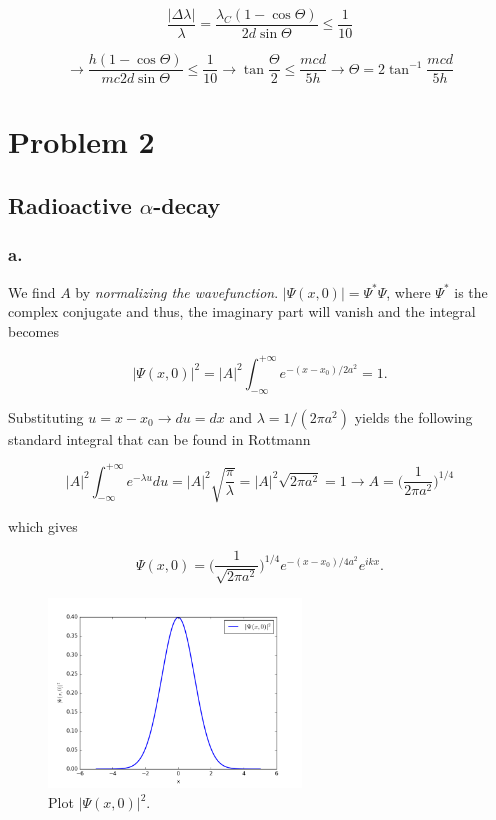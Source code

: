 \documentclass{article}
\begin{document}
\begin{equation}
\frac{|\Delta \lambda|}{\lambda} = \frac{\lambda_C(1 - \cos{\Theta})}{2d\sin{\Theta}} \leq \frac{1}{10}
\end{equation}

\begin{equation}
\rightarrow \frac{h(1 - \cos{\Theta})}{mc2d\sin{\Theta}} \leq \frac{1}{10} \rightarrow \tan{\frac{\Theta}{2}} \leq \frac{mcd}{5h} \rightarrow \Theta = 2\tan^{-1}{\frac{mcd}{5h}}
\end{equation}

\section*{Problem 2}

\subsection*{Radioactive $\alpha$-decay}

\subsubsection*{a.}

We find $A$ by \textit{normalizing the wavefunction}. $|\Psi(x, 0)| = \Psi^*\Psi$, where $\Psi^*$ is the complex conjugate and thus, the imaginary part will vanish and the integral becomes

\begin{equation}
|\Psi(x, 0)|^2 = |A|^2\int_{-\infty}^{+\infty}e^{-(x-x_0)/2a^2} = 1.
\end{equation}

Substituting $u = x-x_0 \rightarrow du = dx$ and $\lambda = 1/(2\pi a^2)$ yields the following standard integral that can be found in Rottmann

\begin{equation}
|A|^2\int_{-\infty}^{+\infty} e^{-\lambda u} du = |A|^2\sqrt{\frac{\pi}{\lambda}} = |A|^2\sqrt{2\pi a^2} = 1 \rightarrow A = \bigg(\frac{1}{2\pi a^2}\bigg)^{1/4}
\end{equation}

which gives 

\begin{equation}
\Psi(x, 0) = \bigg(\frac{1}{\sqrt{2\pi a^2}}\bigg)^{1/4}e^{-(x-x_0)/4a^2}e^{ikx}.
\end{equation}

\begin{figure}[h]
\centering
\includegraphics[width=0.6\textwidth]{normalizedgaussian}
\caption{Plot $|\Psi(x,0)|^2$.}
\label{fig:figure_problem2a}
\end{figure}
\end{document}
